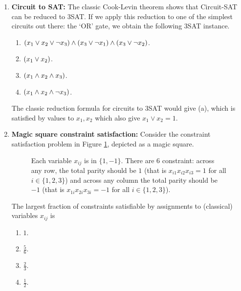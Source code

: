 \documentclass[11pt, svgnames]{article}
\begin{document}
\begin{enumerate} 
\item {\bf Circuit to SAT:} The classic Cook-Levin theorem shows that Circuit-SAT can be reduced to 3SAT. If we apply this reduction to one of the simplest circuits out there: the `OR' gate, we obtain the following 3SAT instance.
\begin{enumerate}
\item $ \left(  x_1\vee x_2\vee  \neg x_3 \right) \wedge  \left( x_3 \vee \neg x_1 \right) \wedge  \left( x_3 \vee \neg x_2 \right) $.
\item $ \left( x_1\vee x_2 \right) $.
\item $ \left( x_1\wedge x_2 \wedge x_3 \right) $.
\item $ \left( x_1\wedge x_2 \wedge \neg x_3 \right) $.
\end{enumerate}


The classic reduction formula for circuits to 3SAT would give (a), which is satisfied by values to $x_1,x_2$ which also give $x_1\lor x_2=1$.

\item {\bf Magic square constraint satisfaction:} Consider the constraint satisfaction problem in Figure \ref{fig:magicsquare}, depicted as a magic square. 

\begin{figure}[h]
\centering
{}
\caption{Each variable $x_{ij}$ is in $\{1,-1\}$. There are $6$ constraint: across any row, the total parity should be $1$ (that is $x_{i1}x_{i2}x_{i3}=1$ for all $i\in \{1,2,3\}$) and across any column the total parity should be $-1$ (that is $x_{1i}x_{2i}x_{3i}=-1$ for all $i\in \{1,2,3\}$).}
\label{fig:magicsquare}
\end{figure}
The largest fraction of constraints satisfiable by assignments to (classical) variables $x_{ij}$ is 
\begin{enumerate}
\item $1$.
\item $\frac{5}{6}$.
\item $\frac{2}{3}$.
\item $\frac{1}{2}$.
\end{enumerate}


\end{enumerate}
\end{document}

